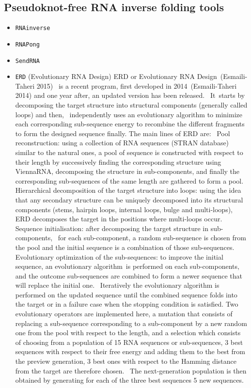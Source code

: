 \subsection{Pseudoknot-free RNA inverse folding tools}
\begin{itemize}
	\item \texttt{RNAinverse} 
	\item \texttt{RNAPong}
	\item \texttt{SendRNA}
	\item \texttt{ERD} (Evolutionary RNA Design)
	ERD or Evolutionary RNA Design (Esmaili-Taheri 2015)  is a recent program, first developed in 2014 (Esmaili-Taheri 2014) and one year after, an updated version has been released.  It starts by decomposing the target structure into structural components (generally called loops) and then,  independently uses an evolutionary algorithm to minimize each corresponding sub-sequence energy to recombine the different fragments to form the designed sequence finally. The main lines of ERD are: 
	Pool reconstruction: using a collection of RNA sequences (STRAN database) similar to the natural ones, a pool of sequence is constructed with respect to their length by successively finding the corresponding structure using ViennaRNA, decomposing the structure in sub-components, and finally the corresponding sub-sequences of the same length are gathered to form a pool.
	Hierarchical decomposition of the target structure into loops: using the idea that any secondary structure can be uniquely decomposed into its structural components (stems, hairpin loops, internal loops, bulge and multi-loops), ERD decomposes the target in the positions where multi-loops occur.
	Sequence initialisation: after decomposing the target structure in sub-components,  for each sub-component, a random sub-sequence is chosen from the pool and the initial sequence is a combination of those sub-sequences. 
	Evolutionary optimization of the sub-sequences: to improve the initial sequence, an evolutionary algorithm is performed on each sub-components, and the outcome sub-sequences are combined to form a newer sequence that will replace the initial one.  Iteratively the evolutionary algorithm is performed on the updated sequence until the combined sequence folds into the target or in a failure case when the stopping condition is satisfied. Two evolutionary operators are implemented here, a mutation that consists of replacing a sub-sequence corresponding to a sub-component by a new random one from the pool with respect to the length, and a selection which consists of choosing from a population of 15 RNA sequences or sub-sequences, 3 best sequences with respect to their free energy and adding them to the best from the preview generation, 3 best ones with respect to the Hamming distance from the target are therefore chosen.  The next-generation population is then obtained by generating for each of the three best sequences 5 new sequences.

\end{itemize}
